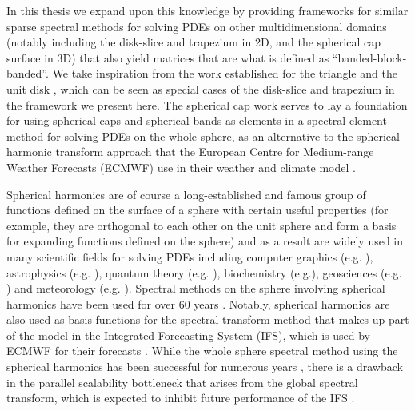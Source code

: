 In this thesis we expand upon this knowledge by providing frameworks for similar sparse spectral methods for solving PDEs on other multidimensional domains (notably including the disk-slice and trapezium in 2D, and the spherical cap surface in 3D) that also yield matrices that are what is defined as \enquote{banded-block-banded}. We take inspiration from the work established for the triangle \cite{olver2019triangle} and the unit disk \cite{vasil2016tensor}, which can  be seen as special cases of the disk-slice and trapezium in the framework we present here. The spherical cap work serves to lay a foundation for using spherical caps and spherical bands as elements in a spectral element method for solving PDEs on the whole sphere, as an alternative to the spherical harmonic transform approach that the European Centre for Medium-range Weather Forecasts (ECMWF) use in their weather and climate model \cite{cheong2006dynamical}. 

Spherical harmonics are of course a long-established and famous group of functions defined on the surface of a sphere with certain useful properties (for example, they are orthogonal to each other on the unit sphere and form a basis for expanding functions defined on the sphere) and as a result are widely used in many scientific fields for solving PDEs including computer graphics (e.g. \cite{moon2008efficient, sloan2013efficient}), astrophysics (e.g. \cite{vasil2019tensor}), quantum theory (e.g. \cite{varshalovich1988quantum}), biochemistry (e.g.\cite{parimal2014application, basko1998application}), geosciences (e.g. \cite{fletcher2017data, hollerbach2013parity}) and meteorology (e.g. \cite{evans1998spherical, rubinstein2015scalar, wedi2013fast, ecmwf2020scalability, courtier1998ecmwf, silberman1954planetary, gottlieb1977numerical}). Spectral methods on the sphere involving spherical harmonics have been used for over 60 years \cite{silberman1954planetary}. Notably, spherical harmonics are also used as basis functions for the spectral transform method that makes up part of the model in the Integrated Forecasting System (IFS), which is used by ECMWF for their forecasts \cite{wedi2013fast}. While the whole sphere spectral method using the spherical harmonics has been successful for numerous years \cite{williamson2007evolution}, there is a drawback in the parallel scalability bottleneck that arises from the global spectral transform, which is expected to inhibit future performance of the IFS \cite{ecmwf2020scalability, wedi2013fast}. 


